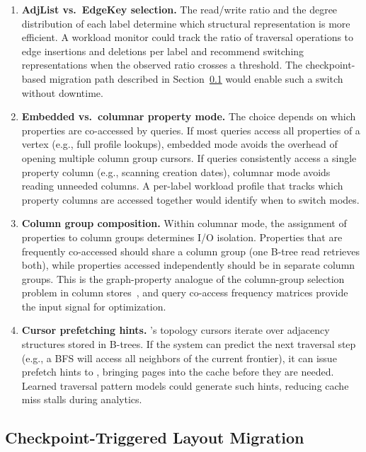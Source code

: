 \begin{enumerate}
\item \textbf{AdjList vs.\ EdgeKey selection.}
The read/write ratio and the degree distribution of each label determine which structural representation is more efficient.
A workload monitor could track the ratio of traversal operations to edge insertions and deletions per label and recommend switching representations when the observed ratio crosses a threshold.
The checkpoint-based migration path described in Section~\ref{sec:future:learned:migration} would enable such a switch without downtime.

\item \textbf{Embedded vs.\ columnar property mode.}
The choice depends on which properties are co-accessed by queries.
If most queries access all properties of a vertex (e.g., full profile lookups), embedded mode avoids the overhead of opening multiple column group cursors.
If queries consistently access a single property column (e.g., scanning creation dates), columnar mode avoids reading unneeded columns.
A per-label workload profile that tracks which property columns are accessed together would identify when to switch modes.

\item \textbf{Column group composition.}
Within columnar mode, the assignment of properties to column groups determines I/O isolation.
Properties that are frequently co-accessed should share a column group (one B-tree read retrieves both), while properties accessed independently should be in separate column groups.
This is the graph-property analogue of the column-group selection problem in column stores~\cite{Rasin2013colstoreselection}, and query co-access frequency matrices provide the input signal for optimization.

\item \textbf{Cursor prefetching hints.}
\project{}'s topology cursors iterate over adjacency structures stored in \wt{} B-trees.
If the system can predict the next traversal step (e.g., a BFS will access all neighbors of the current frontier), it can issue prefetch hints to \wt{}, bringing pages into the cache before they are needed.
Learned traversal pattern models could generate such hints, reducing cache miss stalls during analytics.
\end{enumerate}

\subsection{Checkpoint-Triggered Layout Migration}
\label{sec:future:learned:migration}

